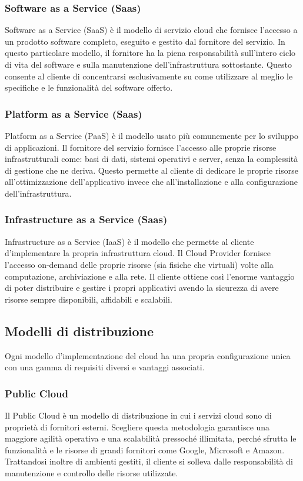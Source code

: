 \subsubsection{Software as a Service (Saas)}
Software as a Service (SaaS) è il modello di servizio cloud che fornisce l'accesso a un prodotto software completo, eseguito e gestito dal fornitore del servizio.
In questo particolare modello, il fornitore ha la piena responsabilità sull'intero ciclo di vita del software e sulla manutenzione dell'infrastruttura sottostante. Questo consente al cliente di concentrarsi esclusivamente su come utilizzare al meglio le specifiche e le funzionalità del software offerto.

\subsubsection{Platform as a Service (Saas)}
Platform as a Service (PaaS) è il modello usato più comunemente per lo sviluppo di applicazioni. Il fornitore del servizio fornisce l'accesso alle proprie risorse infrastrutturali come: basi di dati, sistemi operativi e server, senza la complessità di gestione che ne deriva. Questo permette al cliente di dedicare le proprie risorse all'ottimizzazione dell'applicativo invece che all'installazione e alla configurazione dell'infrastruttura.

\subsubsection{Infrastructure as a Service (Saas)}
Infrastructure as a Service (IaaS) è il modello che permette al cliente d'implementare la propria infrastruttura cloud. Il Cloud Provider fornisce l'accesso on-demand delle proprie risorse (sia fisiche che virtuali) volte alla computazione, archiviazione e alla rete.
Il cliente ottiene così l'enorme vantaggio di poter distribuire e gestire i propri applicativi avendo la sicurezza di avere risorse sempre disponibili, affidabili e scalabili.

\subsection{Modelli di distribuzione}
Ogni modello d'implementazione del cloud ha una propria configurazione unica con una gamma di requisiti diversi e vantaggi associati.

\subsubsection{Public Cloud}
Il Public Cloud è un modello di distribuzione in cui i servizi cloud sono di proprietà di fornitori esterni. Scegliere questa metodologia garantisce una maggiore agilità operativa e una scalabilità pressoché illimitata, perché sfrutta le funzionalità e le risorse di grandi fornitori come Google, Microsoft e Amazon.
Trattandosi inoltre di ambienti gestiti, il cliente si solleva dalle responsabilità di manutenzione e controllo delle risorse utilizzate.

